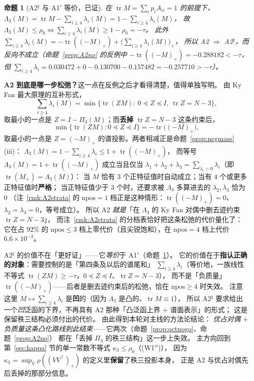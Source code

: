 \documentclass[UTF8,11pt]{ctexart}
\newtheorem{proposition}[theorem]{命题}
\theoremstyle{definition}
\newcommand{\Lam}{\Lambda}
\newcommand{\tr}{\operatorname{tr}}
\begin{document}
\begin{proposition}[A2$^\sharp$ 与 A1$'$ 等价，已证]\label{prop:A2sharp}
在 $\tr M=\sum_ip_iA_{ii}=1$ 的前提下，
$\Lam_3(M)=\tr M-\sum_{i\ge4}\lambda_i(M)=1-\sum_{i\ge4}\lambda_i(M)$，
故 $\Lam_3(M)\le\rho_0\iff\sum_{i\ge4}\lambda_i(M)\ge1-\rho_0=-\tau$。
此外 $\sum_{i\ge4}\lambda_i(M)=-\tr((-M)_+)+\bigl(\sum_{i\ge4}\lambda_i(M)\bigr)_+$，
所以 A2 $\Rightarrow$ A2$^\sharp$，而反向不成立（命题~\ref{prop:A2no} 的反例中
$-\tr((-M)_+)=-0.288182<-\tau$，但 $\sum_{i\ge4}\lambda_i=0.030472+0-0.130700-0.157482=-0.257710>-\tau$）。
\end{proposition}

\textbf{A2 到底是哪一步松弛？}这一点在反例之后才看得清楚，值得单独写明。
由 Ky Fan 最大原理的互补形式，
\[
\sum_{i\ge4}\lambda_i(M)=\min\bigl\{\tr(ZM):\ 0\preceq Z\preceq I,\ \tr Z=N-3\bigr\},
\]
取最小的一点是 $Z=I-\Pi_3(M)$；而\textbf{丢掉} $\tr Z=N-3$ 这条约束后，
\[
\min\{\tr(ZM):0\preceq Z\preceq I\}=-\tr\bigl((-M)_+\bigr),
\]
取最小的一点是 $Z=(-M)_+$ 的谱投影。两者相减正是命题~\ref{prop:negmass}(iii)：
$\Lam_3(M)=1-\sum_{i\ge4}\lambda_i\le1+\tr((-M)_+)$，
而等号 $\Lam_3(M)=1+\tr((-M)_+)$ 成立当且仅当
$\lambda_1+\lambda_2+\lambda_3=\sum_{\lambda_i>0}\lambda_i$（即 $\tr(M_+)=\Lam_3(M)$）：
当 $M$ 恰有 $3$ 个正特征值时自动成立；当有 $4$ 个或更多正特征值时\textbf{严格}；
当正特征值少于 $3$ 个时，还要求被 $\Lam_3$ 多算进去的 $\lambda_2,\lambda_3$ 恰为 $0$
（注~\ref{rmk:A2strata} 的 $\mathrm{npos}=1$ 档正是这种情形：$\tr((-M)_+)=0$、$\lambda_2=\lambda_3=0$，等号成立）。
所以 A2 \emph{就是}「在 $\Lam_3$ 的 Ky Fan 对偶中删去迹约束 $\tr Z=N-3$」，
而注~\ref{rmk:A2strata} 的分档表恰好把这条松弛的代价量化了：
它在占 $92\%$ 的 $\mathrm{npos}\le3$ 档上零代价（且尖锐饱和），在 $\mathrm{npos}=4$ 档上代价 $6.6\times10^{-3}$。

A2$^\sharp$ 的价值不在「更好证」——它\emph{等价}于 A1$'$（命题~\ref{prop:A2sharp}）。
它的价值在于\textbf{指认正确的对象}：需要控制的是「第四条及以后的谱尾和」
$\sum_{i\ge4}\lambda_i$（等价地，一族线性不等式 $\tr(ZM)\ge-\tau$，$0\preceq Z\preceq I$、$\tr Z=N-3$），
而不是「负质量」$\tr((-M)_+)$——后者是删去迹约束后的松弛，恰在 $\mathrm{npos}\ge4$ 时失效。
注意这里 $M\mapsto\sum_{i\ge4}\lambda_i$ 是\textbf{凹}的（因为 $\Lam_3$ 是凸的、$\tr M\equiv1$），
所以 A2$^\sharp$ 要求给出一个\emph{凹}泛函的下界，不再具有 A2 那种「凸泛函上界 $+$ 谱面表示」的形式；
这是保留秩三结构必须付出的代价。
由此得到本轮对主线的方法论结论：
\emph{优占对偶 $+$ 负质量这条凸化路线到此结束}——它两次（命题~\ref{prop:octnogo}、命题~\ref{prop:A2no}）
都在「丢掉 $\Pi_3$ 的秩三结构」这一步上失效。
主方向回到第~\ref{sec:kappa} 节的单一常数不等式 $\kappa_3\le\rho_0$（(W1$''$)），
因为 $\kappa_3=\sup_V\rho((VV^\top)_+)$ 的定义里\textbf{保留}了秩三投影本身，
正是 A2 与优占对偶先后丢掉的那部分信息。
\end{document}

